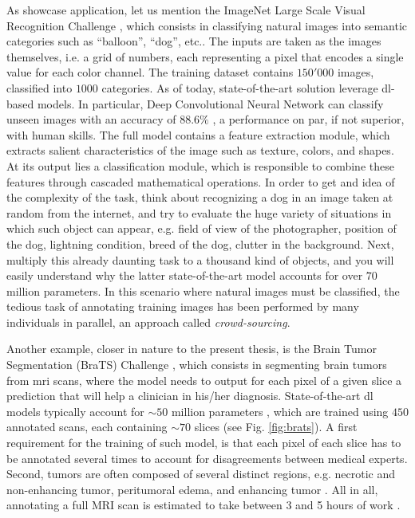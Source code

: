 As showcase application, let us mention the ImageNet Large Scale Visual Recognition Challenge \cite{ILSVRC15}, which consists in classifying natural images into semantic categories such as ``balloon'', ``dog'', etc..
The inputs are taken as the images themselves, i.e. a grid of numbers, each representing a pixel that encodes a single value for each color channel.
The training dataset contains $150'000$ images, classified into $1000$ categories.
As of today, state-of-the-art solution leverage \gls{dl}-based models.
In particular, Deep Convolutional Neural Network can classify unseen images with an accuracy of $88.6\%$ \cite{tan19}, a performance on par, if not superior, with human skills.
The full model contains a feature extraction module, which extracts salient characteristics of the image such as texture, colors, and shapes.
At its output lies a classification module, which is responsible to combine these features through cascaded mathematical operations.
In order to get and idea of the complexity of the task, think about recognizing a dog in an image taken at random from the internet, and try to evaluate the huge variety of situations in which such object can appear, e.g. field of view of the photographer, position of the dog, lightning condition, breed of the dog, clutter in the background.
Next, multiply this already daunting task to a thousand kind of objects, and you will easily understand why the latter state-of-the-art model accounts for over $70$ million parameters.
In this scenario where natural images must be classified, the tedious task of annotating training images has been performed by many individuals in parallel, an approach called \textit{crowd-sourcing}.

Another example, closer in nature to the present thesis, is the Brain Tumor Segmentation (BraTS) Challenge \cite{menze15}, which consists in segmenting brain tumors from \gls{mri} scans, where the model needs to output for each pixel of a given slice a prediction that will help a clinician in his/her diagnosis.
State-of-the-art \gls{dl} models typically account for $\sim 50$ million parameters \cite{chen19}, which are trained using $450$ annotated scans, each containing $\sim 70$ slices (see Fig. \ref{fig:brats}).
A first requirement for the training of such model, is that each pixel of each slice has to be annotated several times to account for disagreements between medical experts.
Second, tumors are often composed of several distinct regions, e.g. necrotic and non-enhancing tumor, peritumoral edema, and enhancing tumor \cite{akil20}.
All in all, annotating a full MRI scan is estimated to take between 3 and 5 hours of work \cite{kaus01}.


